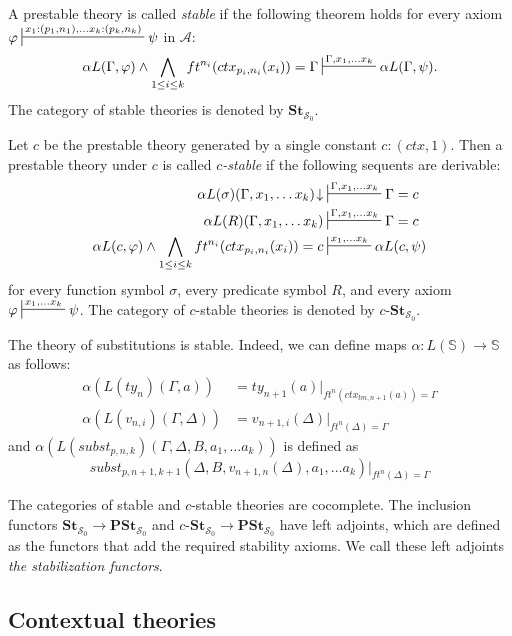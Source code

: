 \documentclass[reqno]{amsart}
\theoremstyle{definition}
\theoremstyle{remark}
\newcommand{\cat}[1]{\mathbf{#1}}
\newcommand{\substTh}{\mathbb{S}}
\newcommand{\St}{\cat{St}}
\newcommand{\PSt}{\cat{PSt}}
\newcommand{\cSt}[1][c]{#1\text{-}\St}
\numberwithin{figure}{section}
\begin{document}
\begin{defn}
A prestable theory is called \emph{stable} if the following theorem holds for every axiom $\varphi \sststile{}{x_1 : (p_1,n_1), \ldots x_k : (p_k,n_k)} \psi$ in $\mathcal{A}$:
\[ \alpha L(\Gamma,\varphi) \land \bigwedge_{1 \leq i \leq k} ft^{n_i}(ctx_{p_i,n_i}(x_i)) = \Gamma \sststile{}{\Gamma, x_1, \ldots x_k} \alpha L(\Gamma,\psi). \]
The category of stable theories is denoted by $\St_{\mathcal{S}_0}$.

Let $c$ be the prestable theory generated by a single constant $c : (ctx,1)$.
Then a prestable theory under $c$ is called \emph{$c$-stable} if the following sequents are derivable:
\begin{align*}
\alpha L(\sigma)(\Gamma, x_1, \ldots x_k)\!\downarrow & \sststile{}{\Gamma, x_1, \ldots x_k} \Gamma = c \\
\alpha L(R)(\Gamma, x_1, \ldots x_k) & \sststile{}{\Gamma, x_1, \ldots x_k} \Gamma = c \\
\alpha L(c,\varphi) \land \bigwedge_{1 \leq i \leq k} ft^{n_i}(ctx_{p_i,n_i}(x_i)) = c & \sststile{}{x_1, \ldots x_k} \alpha L(c,\psi)
\end{align*}
for every function symbol $\sigma$, every predicate symbol $R$, and every axiom $\varphi \sststile{}{x_1, \ldots x_k} \psi$.
The category of $c$-stable theories is denoted by $\cSt_{\mathcal{S}_0}$.
\end{defn}

The theory of substitutions is stable.
Indeed, we can define maps $\alpha : L(\substTh) \to \substTh$ as follows:
\begin{align*}
\alpha(L(ty_n)(\Gamma,a)) & = ty_{n+1}(a)|_{ft^n(ctx_{tm,n+1}(a)) = \Gamma} \\
\alpha(L(v_{n,i})(\Gamma,\Delta)) & = v_{n+1,i}(\Delta)|_{ft^n(\Delta) = \Gamma}
\end{align*}
and $\alpha(L(subst_{p,n,k})(\Gamma, \Delta, B, a_1, \ldots a_k))$ is defined as
\[ subst_{p,n+1,k+1}(\Delta, B, v_{n+1,n}(\Delta), a_1, \ldots a_k)|_{ft^n(\Delta) = \Gamma} \]

The categories of stable and $c$-stable theories are cocomplete.
The inclusion functors $\St_{\mathcal{S}_0} \to \PSt_{\mathcal{S}_0}$ and $\cSt_{\mathcal{S}_0} \to \PSt_{\mathcal{S}_0}$ have left adjoints,
which are defined as the functors that add the required stability axioms.
We call these left adjoints \emph{the stabilization functors}.

\subsection{Contextual theories}
\end{document}
